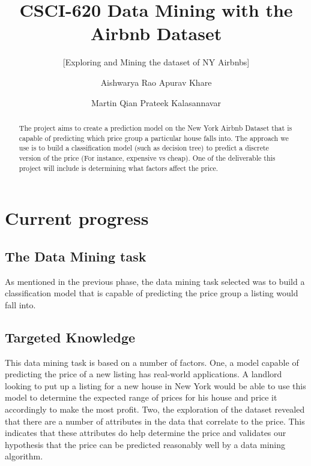 \documentclass{sig-alternate}
\begin{document}
	\title{CSCI-620 Data Mining with the Airbnb Dataset}
	\subtitle{[Exploring and Mining the dataset of NY Airbnbs]}
	
	\author
	{
		\alignauthor
		Aishwarya Rao
		\alignauthor
		Apurav Khare
		\and
		\alignauthor
		Martin Qian
		\alignauthor
		Prateek Kalasannavar
	}
	
	\maketitle
	\begin{abstract}
		
		The project aims to create a prediction model on the New York Airbnb Dataset that is capable of predicting which price group a particular house falls into. The approach we use is to build a classification model (such as decision tree) to predict a discrete version of the price (For instance, expensive vs cheap). One of the deliverable this project will include is determining what factors affect the price.   
		
	\end{abstract}
	
	\section{Current progress}
	
	\subsection{The Data Mining task}
	As mentioned in the previous phase, the data mining task selected was to build a classification model that is capable of predicting the price group a listing would fall into.
	
	\subsection{Targeted Knowledge}
	This data mining task is based on a number of factors. One, a model capable of predicting the price of a new listing has real-world applications. A landlord looking to put up a listing for a new house in New York would be able to use this model to determine the expected range of prices for his house and price it accordingly to make the most profit. Two, the exploration of the dataset revealed that there are a number of attributes in the data that correlate to the price. This indicates that these attributes do help determine the price and validates our hypothesis that the price can be predicted reasonably well by a data mining algorithm. 
\end{document}
